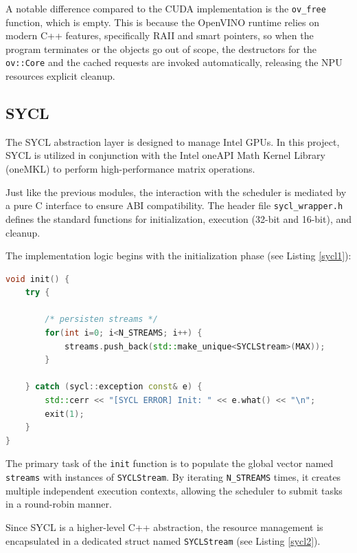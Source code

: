 A notable difference compared to the CUDA implementation is the \texttt{ov\_free} function, which is empty. This is because the OpenVINO runtime relies on modern C++ features, specifically RAII and smart pointers, so when the program terminates or the objects go out of scope, the destructors for the \texttt{ov::Core} and the cached requests are invoked automatically, releasing the NPU resources explicit cleanup.

\subsection{SYCL}
The SYCL abstraction layer is designed to manage Intel GPUs. In this project, SYCL is utilized in conjunction with the Intel oneAPI Math Kernel Library (oneMKL) to perform high-performance matrix operations. 

Just like the previous modules, the interaction with the scheduler is mediated by a pure C interface to ensure ABI compatibility. The header file \texttt{sycl\_wrapper.h} defines the standard functions for initialization, execution (32-bit and 16-bit), and cleanup. 

The implementation logic begins with the initialization phase (see Listing \ref{sycl1}):

\begin{lstlisting}[caption={sycl runner.cpp init}, language=C++, label={sycl1}] 
void init() {
    try {

        /* persisten streams */
        for(int i=0; i<N_STREAMS; i++) {
            streams.push_back(std::make_unique<SYCLStream>(MAX));
        }

    } catch (sycl::exception const& e) {
        std::cerr << "[SYCL ERROR] Init: " << e.what() << "\n";
        exit(1);
    }
}
\end{lstlisting}

The primary task of the \texttt{init} function is to populate the global vector named \texttt{streams} with instances of \texttt{SYCLStream}. By iterating \texttt{N\_STREAMS} times, it creates multiple independent execution contexts, allowing the scheduler to submit tasks in a round-robin manner.

Since SYCL is a higher-level C++ abstraction, the resource management is encapsulated in a dedicated struct named \texttt{SYCLStream} (see Listing \ref{sycl2}).

